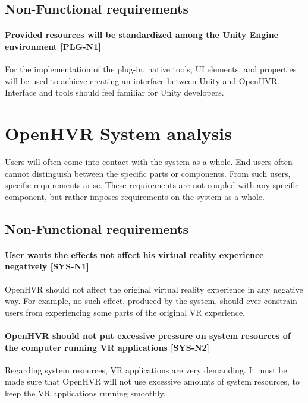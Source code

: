 \subsection{Non-Functional requirements}
\hypertarget{x-\textbf{provided-resources-will-be-standardized-among-the-unity-engine-environment}-[plg-n1]}{\paragraph*{\textbf{Provided resources will be standardized among the Unity Engine environment} [PLG-N1]}}
For the implementation of the plug-in, native tools, UI elements, and properties
will be used to achieve creating an interface between Unity and OpenHVR.
Interface and tools should feel familiar for Unity developers.


\hypertarget{x-openhvr-system-analysis}{\section{OpenHVR System analysis}}
Users will often come into contact with the system as a whole. End-users
often cannot distinguish between the specific parts or components. From such
users, specific requirements arise. These requirements are not coupled with
any specific component, but rather imposes requirements on the system as a whole.


\subsection{Non-Functional requirements}
\paragraph*{\textbf{User wants the effects not affect his virtual reality experience negatively} [SYS-N1]}
OpenHVR should not affect the original virtual reality experience in any
negative way. For example, no such effect, produced by the system, should ever
constrain users from experiencing some parts of the original VR experience.

\hypertarget{x-\textbf{openhvr-should-not-put-excessive-pressure-on-system-resources-of-the-computer-running-vr-applications}-[sys-n2]}{\paragraph*{\textbf{OpenHVR should not put excessive pressure on system resources of the computer running VR applications} [SYS-N2]}}
Regarding system resources, VR applications are very demanding. It must be
made sure that OpenHVR will not use excessive amounts of system resources,
to keep the VR applications running smoothly.

